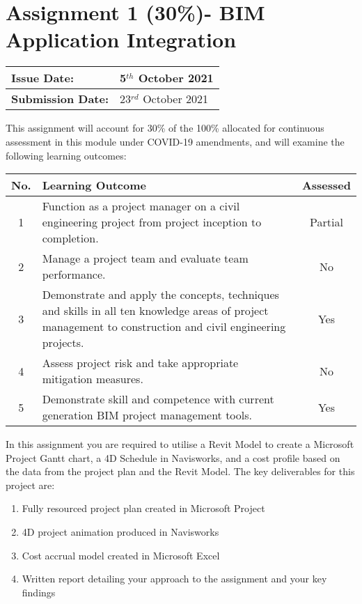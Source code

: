
	

\part*{Assignment 1 (30\%)- BIM Application Integration}

\begin{tabularx}{\textwidth}{ |X|X| }
	\hline
	\textbf{Issue Date:} & 5$^{th}$ October 2021 \\
	\hline 
	\textbf{Submission Date:}  & 23$^{rd}$ October 2021 \\
	\hline
\end{tabularx}

\vspace{.5cm}

This assignment will account for 30\% of the 100\% allocated for continuous assessment in this module under COVID-19 amendments, and will examine the following learning outcomes:\\

\begin{tabularx}{\textwidth}{ |c|X|c| }
	\hline
	\textbf{No.} & \textbf{Learning Outcome} & \textbf{Assessed} \\
	\hline 
	1  & Function as a project manager on a civil engineering project from project inception to completion. & Partial \\
	2  & Manage a project team and evaluate team performance. & No \\
	3  & Demonstrate and apply the concepts, techniques and skills in all ten knowledge areas of project management to construction and civil engineering projects. & Yes \\
	4  & Assess project risk and take appropriate mitigation measures. & No \\
	5  & Demonstrate skill and competence with current generation BIM project management tools. & Yes \\
	\hline
\end{tabularx}

\vspace{.5cm}

In this assignment you are required to utilise a Revit Model to create a Microsoft Project Gantt chart, a 4D Schedule in Navisworks, and a cost profile based on the data from the project plan and the Revit Model.  The key deliverables for this project are:

\begin{enumerate}
	\item Fully resourced project plan created in Microsoft Project
	\item 4D project animation produced in Navisworks
	\item Cost accrual model created in Microsoft Excel
	\item Written report detailing your approach to the assignment and your key findings
\end{enumerate}


